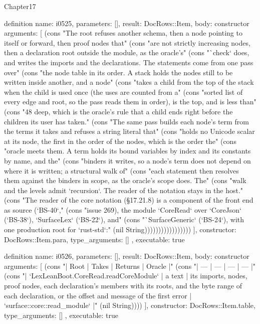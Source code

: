 \begin{lexlean}{Chapter17}
\begin{semanticmodule}
definition{
  name: i0525,
  parameters: [],
  result: DocRows::Item,
  body: constructor{
    arguments: [
      (cons "The root refuses another schema, then a node pointing to itself or forward, then proof nodes that" (cons "are not strictly increasing nodes, then a declaration root outside the module, as the oracle's" (cons "`check` does, and writes the imports and the declarations. The statements come from one pass over" (cons "the node table in its order. A stack holds the nodes still to be written inside another, and a node" (cons "takes a child from the top of the stack when the child is used once (the uses are counted from a" (cons "sorted list of every edge and root, so the pass reads them in order), is the top, and is less than" (cons "48 deep, which is the oracle's rule that a child ends right before the children its user has taken." (cons "The same pass builds each node's term from the terms it takes and refuses a string literal that" (cons "holds no Unicode scalar at its node, the first in the order of the nodes, which is the order the" (cons "oracle meets them. A term holds its bound variables by index and its constants by name, and the" (cons "binders it writes, so a node's term does not depend on where it is written; a structural walk of" (cons "each statement then resolves them against the binders in scope, as the oracle's scope does. The" (cons "walk and the levels admit `recursion`. The reader of the notation stays in the host." (cons "The reader of the core notation (§17.21.8) is a component of the front end as source (`BS-40`," (cons "issue 269), the module `CoreRead` over `CoreJson` (`BS-38`), `SurfaceLex` (`BS-22`), and" (cons "`SurfaceGeneric` (`BS-24`), with one production root for `rust-std`:" (nil String)))))))))))))))))
    ],
    constructor: DocRows::Item.para,
    type_arguments: []
  },
  executable: true
}

definition{
  name: i0526,
  parameters: [],
  result: DocRows::Item,
  body: constructor{
    arguments: [
      (cons "| Root | Takes | Returns | Oracle |" (cons "| --- | --- | --- | --- |" (cons "| `LexLeanBoot.CoreRead.readCoreModule` | a text | its imports, nodes, proof nodes, each declaration's members with its roots, and the byte range of each declaration, or the offset and message of the first error | `surface::core::read_module` |" (nil String))))
    ],
    constructor: DocRows::Item.table,
    type_arguments: []
  },
  executable: true
}


\end{semanticmodule}
\end{lexlean}
